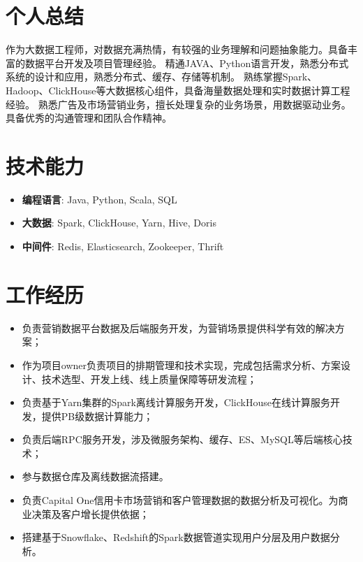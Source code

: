 \documentclass{resume}
\begin{document}

 
\section{个人总结}
作为大数据工程师，对数据充满热情，有较强的业务理解和问题抽象能力。具备丰富的数据平台开发及项目管理经验。
精通JAVA、Python语言开发，熟悉分布式系统的设计和应用，熟悉分布式、缓存、存储等机制。
熟练掌握Spark、Hadoop、ClickHouse等大数据核心组件，具备海量数据处理和实时数据计算工程经验。
熟悉广告及市场营销业务，擅长处理复杂的业务场景，用数据驱动业务。
具备优秀的沟通管理和团队合作精神。

\section{技术能力}
\begin{itemize}[parsep=0.2ex]
  \item \textbf{编程语言}: Java, Python, Scala, SQL
  \item \textbf{大数据}: Spark, ClickHouse, Yarn, Hive, Doris
  \item \textbf{中间件}: Redis, Elasticsearch, Zookeeper, Thrift
\end{itemize}

\section{工作经历}
\begin{itemize}
  \item 负责营销数据平台数据及后端服务开发，为营销场景提供科学有效的解决方案；
  \item 作为项目owner负责项目的排期管理和技术实现，完成包括需求分析、方案设计、技术选型、开发上线、线上质量保障等研发流程；
  \item 负责基于Yarn集群的Spark离线计算服务开发，ClickHouse在线计算服务开发，提供PB级数据计算能力；
  \item 负责后端RPC服务开发，涉及微服务架构、缓存、ES、MySQL等后端核心技术；
  \item 参与数据仓库及离线数据流搭建。
\end{itemize}

\begin{itemize}
  \item 负责Capital One信用卡市场营销和客户管理数据的数据分析及可视化。为商业决策及客户增长提供依据；
  \item 搭建基于Snowflake、Redshift的Spark数据管道实现用户分层及用户数据分析。
\end{itemize}
\end{document}

